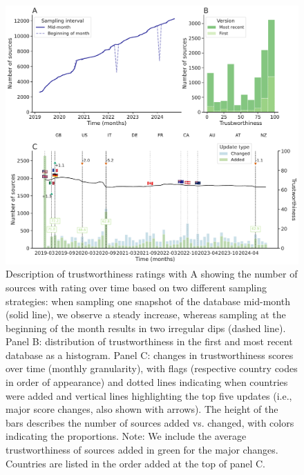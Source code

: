 \documentclass{article}
\begin{document}
\begin{figure}[H]
    \centering
    \includegraphics[width=\textwidth]{figures/trustworthiness_panel.pdf}
    \caption{Description of trustworthiness ratings with A showing the number of sources with rating over time based on two different sampling strategies: when sampling one snapshot of the database mid-month (solid line), we observe a steady increase, whereas sampling at the beginning of the month results in two irregular dips (dashed line). Panel B: distribution of trustworthiness in the first and most recent database as a histogram. Panel C: changes in trustworthiness scores over time (monthly granularity), with flags (respective country codes in order of appearance) and dotted lines indicating when countries were added and vertical lines highlighting the top five updates (i.e., major score changes, also shown with arrows). The height of the bars describes the number of sources added vs. changed, with colors indicating the proportions. Note: We include the average trustworthiness of sources added in green for the major changes. Countries are listed in the order added at the top of panel C.}
    \label{fig:trustworthiness_panel}
\end{figure}
\end{document}
